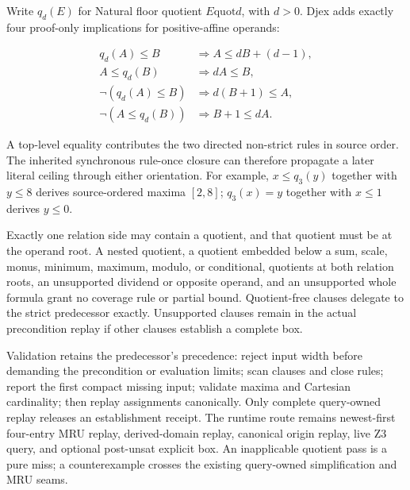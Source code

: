\documentclass[11pt,oneside]{article}
\begin{document}
Write $q_d(E)$ for Natural floor quotient $E\mathbin{\mathrm{quot}}d$, with
$d>0$.  Djex adds exactly four proof-only implications for positive-affine operands:

\begin{align*}
q_d(A) \leq B &\Longrightarrow A \leq dB+(d-1), \\
A \leq q_d(B) &\Longrightarrow dA \leq B, \\
\neg(q_d(A) \leq B) &\Longrightarrow d(B+1) \leq A, \\
\neg(A \leq q_d(B)) &\Longrightarrow B+1 \leq dA.
\end{align*}

A top-level equality contributes the two directed non-strict rules in source order.
The inherited synchronous rule-once closure can therefore propagate a later literal
ceiling through either orientation.  For example, $x\leq q_3(y)$ together with
$y\leq8$ derives source-ordered maxima $[2,8]$; $q_3(x)=y$ together with
$x\leq1$ derives $y\leq0$.

\begin{warningbox}[title=Deliberately narrow authority]
Exactly one relation side may contain a quotient, and that quotient must be at the
operand root.  A nested quotient, a quotient embedded below a sum, scale, monus,
minimum, maximum, modulo, or conditional, quotients at both relation roots, an
unsupported dividend or opposite operand, and an unsupported whole formula grant no
coverage rule or partial bound.  Quotient-free clauses delegate to the strict
predecessor exactly.  Unsupported clauses remain in the actual precondition replay if
other clauses establish a complete box.
\end{warningbox}

Validation retains the predecessor's precedence: reject input width before demanding
the precondition or evaluation limits; scan clauses and close rules; report the first
compact missing input; validate maxima and Cartesian cardinality; then replay
assignments canonically.  Only complete query-owned replay releases an establishment
receipt.  The runtime route remains newest-first four-entry MRU replay, derived-domain
replay, canonical origin replay, live Z3 query, and optional post-unsat explicit box.
An inapplicable quotient pass is a pure miss; a counterexample crosses the existing
query-owned simplification and MRU seams.
\end{document}
